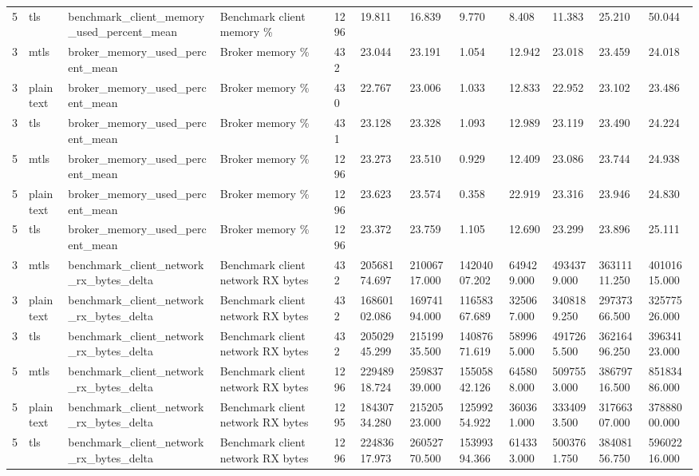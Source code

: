 \begin{longtable}{llllllllllll}
5 & tls & benchmark\_client\_memory\_used\_percent\_mean & Benchmark client memory \% & 1296 & 19.811 & 16.839 & 9.770 & 8.408 & 11.383 & 25.210 & 50.044 \\
3 & mtls & broker\_memory\_used\_percent\_mean & Broker memory \% & 432 & 23.044 & 23.191 & 1.054 & 12.942 & 23.018 & 23.459 & 24.018 \\
3 & plaintext & broker\_memory\_used\_percent\_mean & Broker memory \% & 430 & 22.767 & 23.006 & 1.033 & 12.833 & 22.952 & 23.102 & 23.486 \\
3 & tls & broker\_memory\_used\_percent\_mean & Broker memory \% & 431 & 23.128 & 23.328 & 1.093 & 12.989 & 23.119 & 23.490 & 24.224 \\
5 & mtls & broker\_memory\_used\_percent\_mean & Broker memory \% & 1296 & 23.273 & 23.510 & 0.929 & 12.409 & 23.086 & 23.744 & 24.938 \\
5 & plaintext & broker\_memory\_used\_percent\_mean & Broker memory \% & 1296 & 23.623 & 23.574 & 0.358 & 22.919 & 23.316 & 23.946 & 24.830 \\
5 & tls & broker\_memory\_used\_percent\_mean & Broker memory \% & 1296 & 23.372 & 23.759 & 1.105 & 12.690 & 23.299 & 23.896 & 25.111 \\
3 & mtls & benchmark\_client\_network\_rx\_bytes\_delta & Benchmark client network RX bytes & 432 & 20568174.697 & 21006717.000 & 14204007.202 & 649429.000 & 4934379.000 & 36311111.250 & 40101615.000 \\
3 & plaintext & benchmark\_client\_network\_rx\_bytes\_delta & Benchmark client network RX bytes & 432 & 16860102.086 & 16974194.000 & 11658367.689 & 325067.000 & 3408189.250 & 29737366.500 & 32577526.000 \\
3 & tls & benchmark\_client\_network\_rx\_bytes\_delta & Benchmark client network RX bytes & 432 & 20502945.299 & 21519935.500 & 14087671.619 & 589965.000 & 4917265.500 & 36216496.250 & 39634123.000 \\
5 & mtls & benchmark\_client\_network\_rx\_bytes\_delta & Benchmark client network RX bytes & 1296 & 22948918.724 & 25983739.000 & 15505842.126 & 645808.000 & 5097553.000 & 38679716.500 & 85183486.000 \\
5 & plaintext & benchmark\_client\_network\_rx\_bytes\_delta & Benchmark client network RX bytes & 1295 & 18430734.280 & 21520523.000 & 12599254.922 & 360361.000 & 3334093.500 & 31766307.000 & 37888000.000 \\
5 & tls & benchmark\_client\_network\_rx\_bytes\_delta & Benchmark client network RX bytes & 1296 & 22483617.973 & 26052770.500 & 15399394.366 & 614333.000 & 5003761.750 & 38408156.750 & 59602216.000 \\

\end{longtable}
